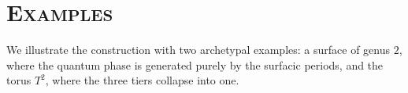 \documentclass[11pt,reqno,letterpaper,twoside]{amsart}
\begin{document}
  
  \section{\textsc{\textbf{Examples}}}
  \label{sec:Examples}
  
  We illustrate the construction with two archetypal examples:
  a surface of genus $2$,
  where the quantum phase is generated purely by the surfacic periods,
  and the torus $T^2$,
  where the three tiers collapse into one.
  
\end{document}

